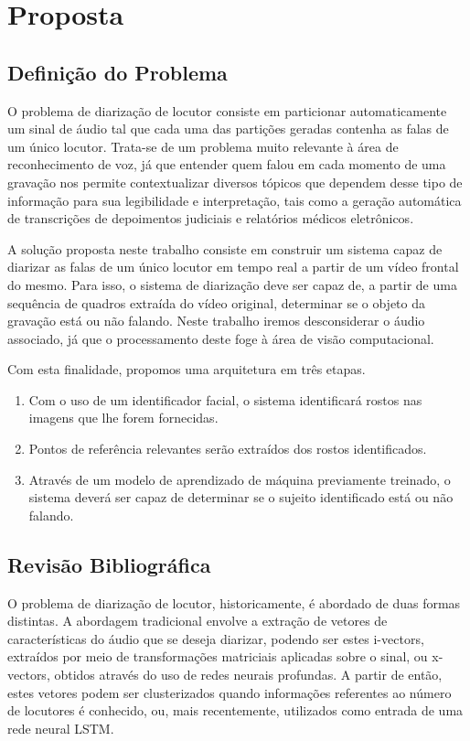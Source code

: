 \chapter{Proposta}
\label{ch:proposal}

\section{Definição do Problema}
\label{sec:problem-desc}

O problema de diarização de locutor consiste em particionar automaticamente um sinal de áudio tal que cada uma das partições geradas contenha as falas de um único locutor. Trata-se de um problema muito relevante à área de reconhecimento de voz, já que entender quem falou em cada momento de uma gravação nos permite contextualizar diversos tópicos que dependem desse tipo de informação para sua legibilidade e interpretação, tais como a geração automática de transcrições de depoimentos judiciais e relatórios médicos eletrônicos.

A solução proposta neste trabalho consiste em construir um sistema capaz de diarizar as falas de um único locutor em tempo real a partir de um vídeo frontal do mesmo. Para isso, o sistema de diarização deve ser capaz de, a partir de uma sequência de quadros extraída do vídeo original, determinar se o objeto da gravação está ou não falando. Neste trabalho iremos desconsiderar o áudio associado, já que o processamento deste foge à área de visão computacional.

Com esta finalidade, propomos uma arquitetura em três etapas. 
\begin{enumerate}
    \item Com o uso de um identificador facial, o sistema identificará rostos nas imagens que lhe forem fornecidas. 
    \item Pontos de referência relevantes serão extraídos dos rostos identificados. 
    \item Através de um modelo de aprendizado de máquina previamente treinado, o sistema deverá ser capaz de determinar se o sujeito identificado está ou não falando.
\end{enumerate}

\section{Revisão Bibliográfica}
\label{sec:related-work}

O problema de diarização de locutor, historicamente, é abordado de duas formas distintas. A abordagem tradicional envolve a extração de vetores de características do áudio que se deseja diarizar, podendo ser estes i-vectors\cite{dehakFrontEndFactorAnalysis2011}, extraídos por meio de transformações matriciais aplicadas sobre o sinal, ou x-vectors\cite{snyderXVectorsRobustDNN2018}, obtidos através do uso de redes neurais profundas. A partir de então, estes vetores podem ser clusterizados\cite{sellSpeakerDiarizationPlda2014} quando informações referentes ao número de locutores é conhecido, ou, mais recentemente, utilizados como entrada de uma rede neural LSTM\cite{wangSpeakerDiarizationLSTM2018}.

